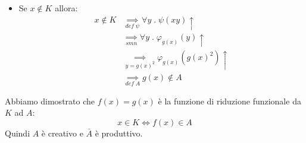 \documentclass[a4paper]{article}
\begin{document}
\begin{exercise}
\begin{enumerate}
\begin{itemize}
      \item Se \( x \notin K \) allora:
        \[
          \begin{aligned}
            x \notin K &\underset{def\; \psi}{\implies} \forall y \;.\; \psi(xy)\uparrow\\
                        &\underset{smn}{\implies} \forall y \;.\; \varphi_{g(x)}(y) \uparrow\\
                        &\underset{y = g(x)^2}{\implies} \varphi_{g(x)}(g(x)^2) \uparrow\\
                        &\underset{def\; A}{\implies} g(x) \notin A
          \end{aligned}
        \]
    \end{itemize}
    Abbiamo dimostrato che \( f(x) = g(x) \) è la funzione di riduzione funzionale
    da \( K \) ad \( A \):
    \[
      x \in K \iff f(x) \in A
    \]
    Quindi \( A \) è creativo e \( \bar{A} \) è produttivo.
  \end{enumerate}
\end{exercise}
\end{document}
